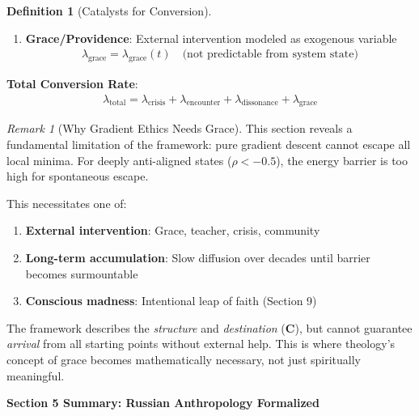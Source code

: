 \documentclass[11pt,a4paper]{article}
\theoremstyle{definition}
\newtheorem{definition}{Definition}[section]
\theoremstyle{remark}
\newtheorem{remark}{Remark}[section]
\begin{document}
\begin{small}
\begin{enumerate}
\begin{definition}[Catalysts for Conversion]
\begin{enumerate}
    \item \textbf{Grace/Providence}: External intervention modeled as exogenous variable
    \begin{align}
    \lambda_{\text{grace}} = \lambda_{\text{grace}}(t) \quad \text{(not predictable from system state)}
    \end{align}
\end{enumerate}

\textbf{Total Conversion Rate}:
\begin{align}
\lambda_{\text{total}} = \lambda_{\text{crisis}} + \lambda_{\text{encounter}} + \lambda_{\text{dissonance}} + \lambda_{\text{grace}}
\end{align}
\end{definition}

\begin{remark}[Why Gradient Ethics Needs Grace]
This section reveals a fundamental limitation of the framework: pure gradient descent cannot escape all local minima. For deeply anti-aligned states (\(\rho < -0.5\)), the energy barrier is too high for spontaneous escape.

This necessitates one of:
\begin{enumerate}
    \item \textbf{External intervention}: Grace, teacher, crisis, community
    \item \textbf{Long-term accumulation}: Slow diffusion over decades until barrier becomes surmountable
    \item \textbf{Conscious madness}: Intentional leap of faith (Section 9)
\end{enumerate}

The framework describes the \textit{structure} and \textit{destination} (\(\mathbf{C}\)), but cannot guarantee \textit{arrival} from all starting points without external help. This is where theology's concept of grace becomes mathematically necessary, not just spiritually meaningful.
\end{remark}

\begin{mdframed}[backgroundcolor=green!10,linewidth=2pt,linecolor=green!70!black]
\textbf{Section 5 Summary: Russian Anthropology Formalized}


\end{mdframed}
\end{enumerate}
\end{small}
\end{document}
